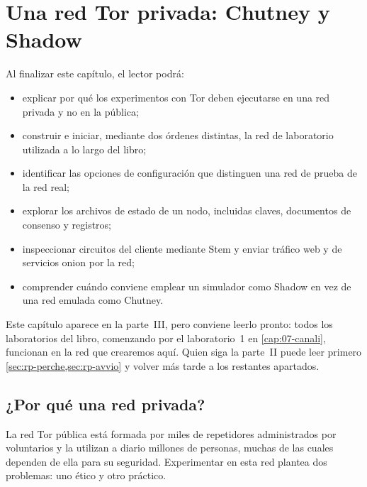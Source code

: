 \chapter{Una red Tor privada: Chutney y Shadow}\label{cap:19-rete-privata}

\begin{obiettivi}
Al finalizar este capítulo, el lector podrá:
\begin{itemize}[nosep]
  \item explicar por qué los experimentos con Tor deben ejecutarse en una red privada y no en la pública;
  \item construir e iniciar, mediante dos órdenes distintas, la red de laboratorio utilizada a lo largo del libro;
  \item identificar las opciones de configuración que distinguen una red de prueba de la red real;
  \item explorar los archivos de estado de un nodo, incluidas claves, documentos de consenso y registros;
  \item inspeccionar circuitos del cliente mediante Stem y enviar tráfico web y de servicios onion por la red;
  \item comprender cuándo conviene emplear un simulador como Shadow en vez de una red emulada como Chutney.
\end{itemize}
\end{obiettivi}

Este capítulo aparece en la parte~III, pero conviene leerlo pronto: todos los laboratorios del libro, comenzando por el laboratorio~1 en \cref{cap:07-canali}, funcionan en la red que crearemos aquí. Quien siga la parte~II puede leer primero \cref{sec:rp-perche,sec:rp-avvio} y volver más tarde a los restantes apartados.

\section{¿Por qué una red privada?}\label{sec:rp-perche}

La red Tor pública está formada por miles de repetidores administrados por voluntarios y la utilizan a diario millones de personas, muchas de las cuales dependen de ella para su seguridad. Experimentar en esta red plantea dos problemas: uno ético y otro práctico.

